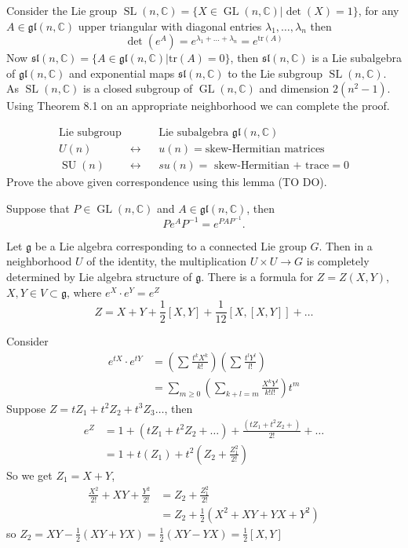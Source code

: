 \documentclass[11pt,a4paper]{scrarticle}
\theoremstyle{definition}
\theoremstyle{greenbox}
\newcommand{\C}{\mathbb{C}}
\newcommand{\fg}{\mathfrak{g}}
\begin{document}
Consider the Lie group $ \operatorname{SL}(n,\C) = \{X \in \operatorname{GL}(n,\C) | \det(X) = 1\} $, for any $ A \in \mathfrak{gl}(n,\C) $ upper triangular with diagonal entries $ \lambda_{1}, \ldots, \lambda_{n} $ then 
\[ \det(e^{A})  = e^{\lambda_{1}+ \ldots + \lambda_{n}} = e^{\text{tr}(A)} \]
Now $ \mathfrak{sl}(n,\C) = \{A \in \mathfrak{gl}(n,\C) |  \text{tr}(A) = 0\} $, then $ \mathfrak{sl}(n,\C) $ is a Lie subalgebra of $ \mathfrak{gl}(n,\C) $ and exponential maps $ \mathfrak{sl}(n,\C) $ to the Lie subgroup $ \operatorname{SL}(n,\C) $. As $ \operatorname{SL}(n,\C) $ is a closed subgroup of $ \operatorname{GL}(n,\C) $ and dimension $ 2(n^{2}-1) $. Using Theorem 8.1 on an appropriate neighborhood we can complete the proof. 

\begin{align*}
    \text{Lie subgroup} &  && \text{Lie subalgebra } \mathfrak{gl}(n,\C) \\
    U(n) & \longleftrightarrow && u(n) = \text{skew-Hermitian matrices} \\
    \operatorname{SU}(n) & \longleftrightarrow && su(n) = \text{ skew-Hermitian + trace}=0
\end{align*}
Prove the above given correspondence using this lemma (TO DO).
\begin{lemma}
    Suppose that $ P \in \operatorname{GL}(n,\C) $ and $ A \in \mathfrak{gl}(n,\C) $, then 
    \[ Pe^{A}P^{-1} = e^{PAP^{-1}}. \]
     
\end{lemma}

\begin{thm}
     Let $ \fg $ be a Lie algebra corresponding to a connected Lie group $ G $. Then in a neighborhood $ U $ of the identity, the multiplication $ U \times U \to G $ is completely determined by Lie algebra structure of $ \fg $. There is a formula for $ Z = Z(X,Y) $, $ X,Y \in V \subset \fg $, where $ e^{X}\cdot e^{Y} = e^{Z}$ 
    \[ Z =  X+Y + \frac{1}{2}[X,Y]+ \frac{1}{12}[X,[X,Y]]+ \ldots \]
\end{thm}
Consider \begin{align*}
    e^{tX} \cdot e^{tY} & = \left( \sum_{}^{} \frac{t^{k}X^{k}}{k!} \right) \left( \sum_{}^{} \frac{t^{l}Y^{l}}{l!} \right) \\
    & = \sum_{m \ge 0}^{} \left( \sum_{k+l=m}^{} \frac{X^{k}Y^{l}}{k!l!}  \right)t^{m} 
\end{align*}
Suppose $ Z = tZ_{1}+ t^{2}Z_{2} +t^{3}Z_{3} \ldots $, then \begin{align*}
    e^{Z} & = 1+(tZ_{1}+ t^{2}Z_{2}+ \ldots) + \frac{\left( tZ_{1}+ t^{2}Z_{2}+  \right)}{2!} + \ldots \\
    & = 1+ t(Z_{1})+ t^{2}\left(Z_{2}+ \frac{Z_{1}^{2}}{2!}\right)
\end{align*}
So we get $ Z_{1} = X+Y $, \begin{align*}
    \frac{X^{2}}{2!}+ XY+ \frac{Y^{2}}{2!} & = Z_{2}+ \frac{Z_{1}^{2}}{2!} \\
    & = Z_{2} + \frac{1}{2}\left( X^{2}+ XY+YX+Y^{2} \right)
\end{align*}
so $ Z_{2} = XY - \frac{1}{2}\left( XY+YX \right)  = \frac{1}{2}\left( XY-YX \right) = \frac{1}{2}[X,Y]$
\end{document}
